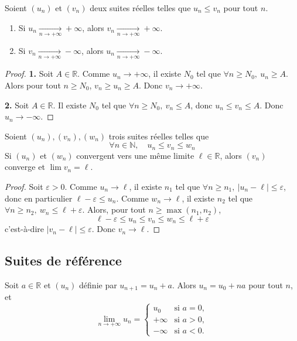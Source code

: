 \begin{prop}[Comparaison]
\label{prop:comparaison}
Soient $(u_n)$ et $(v_n)$ deux suites réelles telles que $u_n\leq v_n$ pour tout $n$.
\begin{enumerate}
\item Si $u_n\xrightarrow[n\to+\infty]{}+\infty$, alors $v_n\xrightarrow[n\to+\infty]{}+\infty$.
\item Si $v_n\xrightarrow[n\to+\infty]{}-\infty$, alors $u_n\xrightarrow[n\to+\infty]{}-\infty$.
\end{enumerate}
\end{prop}

\begin{proof}
\textbf{1.} Soit $A\in\mathbb{R}$. Comme $u_n\to+\infty$, il existe $N_0$ tel que $\forall n\geq N_0,\ u_n\geq A$. Alors pour tout $n\geq N_0$, $v_n\geq u_n\geq A$. Donc $v_n\to+\infty$.

\textbf{2.} Soit $A\in\mathbb{R}$. Il existe $N_0$ tel que $\forall n\geq N_0,\ v_n\leq A$, donc $u_n\leq v_n\leq A$. Donc $u_n\to-\infty$.
\end{proof}

\begin{theo}
\label{theo:gendarmes}
Soient $(u_n),(v_n),(w_n)$ trois suites réelles telles que
\[\forall n\in\mathbb{N},\quad u_n\leq v_n\leq w_n\]
Si $(u_n)$ et $(w_n)$ convergent vers une même limite $\ell\in\mathbb{R}$, alors $(v_n)$ converge et $\lim v_n=\ell$.
\end{theo}

\begin{proof}
Soit $\varepsilon>0$. Comme $u_n\to\ell$, il existe $n_1$ tel que $\forall n\geq n_1,\ |u_n-\ell|\leq\varepsilon$, donc en particulier $\ell-\varepsilon\leq u_n$. Comme $w_n\to\ell$, il existe $n_2$ tel que $\forall n\geq n_2,\ w_n\leq\ell+\varepsilon$. Alors, pour tout $n\geq\max(n_1,n_2)$,
\[\ell-\varepsilon \leq u_n \leq v_n \leq w_n \leq \ell+\varepsilon\]
c'est-à-dire $|v_n-\ell|\leq\varepsilon$. Donc $v_n\to\ell$.
\end{proof}

\subsection{Suites de référence}

\begin{prop}
Soit $a\in\mathbb{R}$ et $(u_n)$ définie par $u_{n+1}=u_n+a$. Alors $u_n=u_0+na$ pour tout $n$, et
\[\lim_{n\to+\infty}u_n = \begin{cases} u_0 & \text{si } a=0,\\ +\infty & \text{si } a>0,\\ -\infty & \text{si } a<0.\end{cases}\]
\end{prop}

